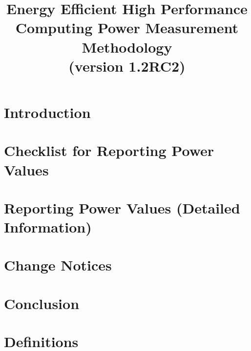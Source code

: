 \documentclass[runningheads]{scrreprt}
\begin{document}
\pagestyle{headings}  %

\title{
Energy Efficient High Performance Computing Power Measurement Methodology \\
\bigskip
\normalsize{(version 1.2RC2)}
}


\date{ }
\maketitle              %

\tableofcontents
\listoftables
\listoffigures

%
\chapter{Introduction}

\label{sec:intro}

\chapter{Checklist for Reporting Power Values}

\label{sec:checklist}

\chapter{Reporting Power Values \normalsize{(Detailed Information)}}

\label{sec:reporting}
\newpage


\chapter{Change Notices}

\label{sec:changenotices}


\chapter{Conclusion}

\label{sec:conclusion}

\chapter{Definitions}

\label{sec:definitions}
\end{document}
